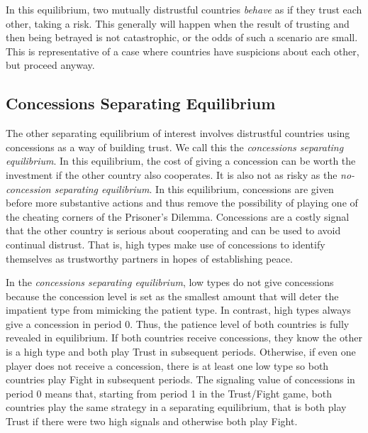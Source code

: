 \documentclass[12pt, letterpaper]{article}
\begin{document}
In this equilibrium, two mutually distrustful countries \emph{behave} as if they trust each other, taking a risk. This generally will happen when the result of trusting and then being betrayed is not catastrophic, or the odds of such a scenario are small. This is representative of a case where countries have suspicions about each other, but proceed anyway. 


\subsection{Concessions Separating Equilibrium}
\label{sec:cse}
The other separating equilibrium of interest involves distrustful countries using concessions as a way of building trust. We call this the \emph{concessions separating equilibrium}. In this equilibrium, the cost of giving a concession can be worth the investment if the other country also cooperates. It is also not as risky as the \emph{no-concession separating equilibrium}. In this equilibrium, concessions are given before more substantive actions and thus remove the possibility of playing one of the cheating corners of the Prisoner's Dilemma. Concessions are a costly signal that the other country is serious about cooperating and can be used to avoid continual distrust. That is, high types make use of concessions to identify themselves as trustworthy partners in hopes of establishing peace.

In the \emph{concessions separating equilibrium}, low types do not give concessions because the concession level is set as the smallest amount that will deter the impatient type from mimicking the patient type. In contrast, high types always give a concession in period 0. Thus, the patience level of both countries is fully revealed in equilibrium. If both countries receive concessions, they know the other is a high type and both play Trust in subsequent periods. Otherwise, if even one player does not receive a concession, there is at least one low type so both countries play Fight in subsequent periods. The signaling value of concessions in period 0 means that, starting from period 1 in the Trust/Fight game, both countries play the same strategy in a separating equilibrium, that is both play Trust if there were two high signals and otherwise both play Fight.
\end{document}
